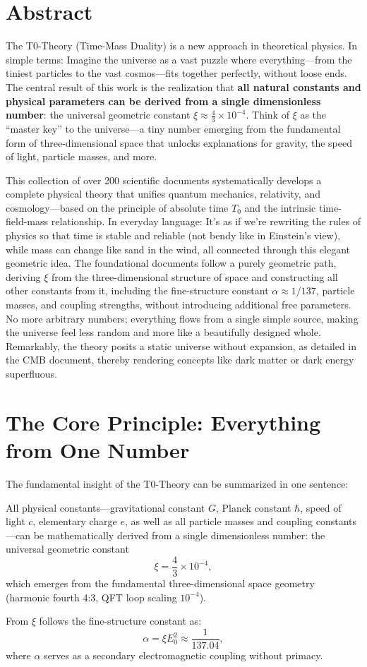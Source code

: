 \section*{Abstract}
		The T0-Theory (Time-Mass Duality) is a new approach in theoretical physics. In simple terms: Imagine the universe as a vast puzzle where everything—from the tiniest particles to the vast cosmos—fits together perfectly, without loose ends. The central result of this work is the realization that \textbf{all natural constants and physical parameters can be derived from a single dimensionless number}: the universal geometric constant $\xi \approx \frac{4}{3} \times 10^{-4}$. Think of $\xi$ as the ``master key'' to the universe—a tiny number emerging from the fundamental form of three-dimensional space that unlocks explanations for gravity, the speed of light, particle masses, and more.
		
		This collection of over 200 scientific documents systematically develops a complete physical theory that unifies quantum mechanics, relativity, and cosmology—based on the principle of absolute time $T_0$ and the intrinsic time-field-mass relationship. In everyday language: It's as if we're rewriting the rules of physics so that time is stable and reliable (not bendy like in Einstein's view), while mass can change like sand in the wind, all connected through this elegant geometric idea. The foundational documents follow a purely geometric path, deriving $\xi$ from the three-dimensional structure of space and constructing all other constants from it, including the fine-structure constant $\alpha \approx 1/137$, particle masses, and coupling strengths, without introducing additional free parameters. No more arbitrary numbers; everything flows from a single simple source, making the universe feel less random and more like a beautifully designed whole. Remarkably, the theory posits a static universe without expansion, as detailed in the CMB document, thereby rendering concepts like dark matter or dark energy superfluous.

	
	\section{The Core Principle: Everything from One Number}
	
	The fundamental insight of the T0-Theory can be summarized in one sentence:
	
	\begin{keyresult}
		All physical constants—gravitational constant $G$, Planck constant $\hbar$, speed of light $c$, elementary charge $e$, as well as all particle masses and coupling constants—can be mathematically derived from a single dimensionless number: the universal geometric constant
		\[
		\xi = \frac{4}{3} \times 10^{-4},
		\]
		which emerges from the fundamental three-dimensional space geometry (harmonic fourth 4:3, QFT loop scaling $10^{-4}$).

		From $\xi$ follows the fine-structure constant as:
		\[
		\alpha = \xi E_0^2 \approx \frac{1}{137.04},
		\]
		where $\alpha$ serves as a secondary electromagnetic coupling without primacy.
	\end{keyresult}
	
